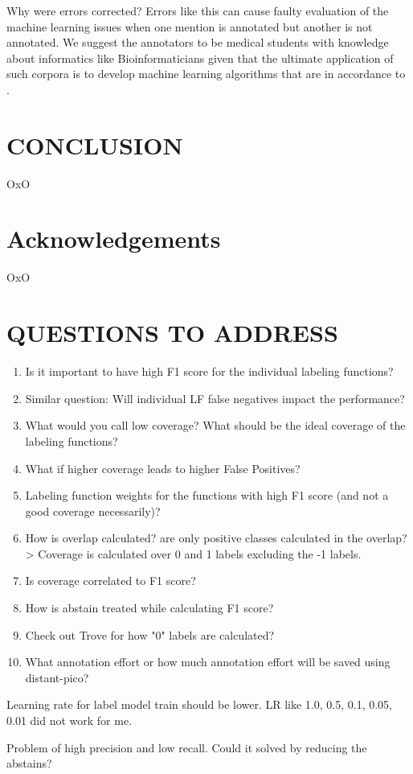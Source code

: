\documentclass[10.7pt,]{article}
\begin{document}
Why were errors corrected?
Errors like this can cause faulty evaluation of the machine learning issues when one mention is annotated but another is not annotated.
We suggest the annotators to be medical students with knowledge about informatics like Bioinformaticians given that the ultimate application of such corpora is to develop machine learning algorithms that are in accordance to .
%
%
%
\section{CONCLUSION}\label{conclusion}
%
OxO
%
%
%
\section{Acknowledgements}\label{acknowledgements}
%
OxO
%
%
%
\section{QUESTIONS TO ADDRESS}\label{ques}
%

\begin{enumerate}
    \item Is it important to have high F1 score for the individual labeling functions?
    \item Similar question: Will individual LF false negatives impact the performance?
    \item What would you call low coverage? What should be the ideal coverage of the labeling functions?
    \item What if higher coverage leads to higher False Positives?
    \item Labeling function weights for the functions with high F1 score (and not a good coverage necessarily)?
    \item How is overlap calculated? are only positive classes calculated in the overlap? > Coverage is calculated over 0 and 1 labels excluding the -1 labels.
    \item Is coverage correlated to F1 score?
    \item How is abstain treated while calculating F1 score?
    \item Check out Trove for how "0" labels are calculated?
    \item What annotation effort or how much annotation effort will be saved using distant-pico?
\end{enumerate}

Learning rate for label model train should be lower. LR like 1.0, 0.5, 0.1, 0.05, 0.01 did not work for me.

Problem of high precision and low recall. Could it solved by reducing the abstains?
%
%
%


\end{document}
